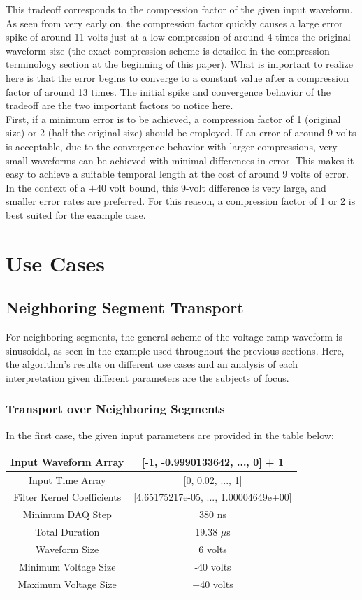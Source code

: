 \documentclass[11pt, a4paper]{article}
\theoremstyle{definition}
\numberwithin{equation}{section}
\begin{document}
This tradeoff corresponds to the compression factor of the given input waveform. As seen from very early on, the compression factor quickly causes a large error spike of around 11 volts just at a low compression of around 4 times the original waveform size (the exact compression scheme is detailed in the compression terminology section at the beginning of this paper). What is important to realize here is that the error begins to converge to a constant value after a compression factor of around 13 times. The initial spike and convergence behavior of the tradeoff are the two important factors to notice here.
\\
First, if a minimum error is to be achieved, a compression factor of 1 (original size) or 2 (half the original size) should be employed. If an error of around 9 volts is acceptable, due to the convergence behavior with larger compressions, very small waveforms can be achieved with minimal differences in error. This makes it easy to achieve a suitable temporal length at the cost of around 9 volts of error. 
\\
In the context of a $\pm$40 volt bound, this 9-volt difference is very large, and smaller error rates are preferred. For this reason, a compression factor of 1 or 2 is best suited for the example case.

\section{Use Cases}
\subsection{Neighboring Segment Transport}
For neighboring segments, the general scheme of the voltage ramp waveform is sinusoidal, as seen in the example used throughout the previous sections. Here, the algorithm's results on different use cases and an analysis of each interpretation given different parameters are the subjects of focus.
\subsubsection{Transport over Neighboring Segments}
In the first case, the given input parameters are provided in the table below:

\begin{center}
\begin{tabular}{ | c | c | } 
  \hline
   Input Waveform Array & [-1, -0.9990133642, ..., 0] + 1 \\ 
  \hline
  Input Time Array & [0, 0.02, ..., 1] \\ 
  \hline
  Filter Kernel Coefficients & [4.65175217e-05, ..., 1.00004649e+00] \\ 
  \hline
  Minimum DAQ Step & 380 ns \\ 
  \hline
  Total Duration & 19.38 $\mu$s \\ 
  \hline
  Waveform Size & 6 volts \\ 
  \hline
  Minimum Voltage Size & -40 volts \\ 
  \hline
  Maximum Voltage Size & +40 volts \\ 
  \hline
\end{tabular}
\end{center}
\end{document}
